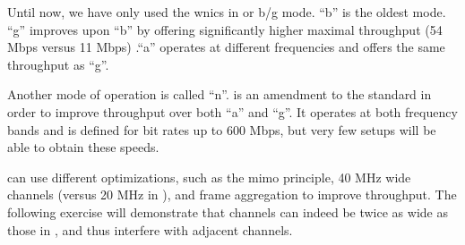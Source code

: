 Until now, we have only used the \acp{wnic} in  or b/g mode. ``b'' is the oldest mode. ``g'' improves upon ``b'' by offering significantly higher maximal throughput (54 Mbps versus 11 Mbps) .``a'' operates at different frequencies and offers the same throughput as ``g''.

Another mode of operation is called ``n''.  is an amendment to the \wifi standard in order to improve throughput over both ``a'' and ``g''. It operates at both frequency bands and is defined for bit rates up to 600 Mbps, but very few setups will be able to obtain these speeds.

 can use different optimizations, such as the \ac{mimo} principle, 40 MHz wide channels (versus 20 MHz in ), and frame aggregation to improve throughput. The following exercise will demonstrate that  channels can indeed be twice as wide as those in , and thus interfere with adjacent  channels.

